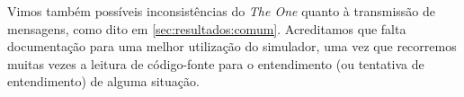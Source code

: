 \documentclass[conference]{IEEEtran}
\begin{document}
Vimos também possíveis inconsistências do \emph{The One} quanto à transmissão de mensagens, como dito em \ref{sec:resultados:comum}. 
Acreditamos que falta documentação para uma melhor utilização do simulador, uma vez que recorremos muitas vezes a leitura de código-fonte para o entendimento (ou tentativa de entendimento) de alguma situação.

%
%



%
%
\end{document}
